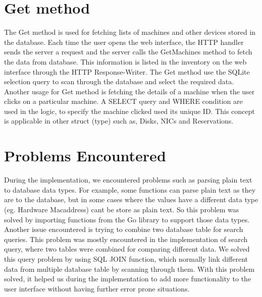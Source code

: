\section{Get method}
The Get method is used for fetching lists of machines and other devices stored in the database. Each time the user opens the web interface, the HTTP handler sends the server a request and the server calls the GetMachines method to fetch the data from database. This information is listed in the inventory on the web interface through the HTTP Response-Writer. The Get method use the SQLite selection query to scan through the database and select the required data.  Another usage for Get method is fetching the details of a machine when the user clicks on a particular machine. A SELECT query and WHERE condition are used in the logic, to specify the machine clicked used its unique ID. This concept is applicable in other struct (type) such as, Disks, NICs and Reservations. 
 
\section{Problems Encountered}
During the implementation, we encountered problems such as parsing plain text to database data types. For example, some functions can parse plain text as they are to the database, but in some cases where the values have a different data type (eg. Hardware Macaddress) cant be store as plain text. So this problem was solved by importing functions from the Go library to support those data types. Another issue encountered is trying to combine two database table for search queries. This problem was mostly encountered in the implementation of search query, where two tables were combined for comparing different data.  We solved this query problem by using SQL JOIN function, which normally link different data from multiple database table by scanning through them. With this problem solved, it helped us during the implementation to add more functionality to the user interface without having further error prone situations.



